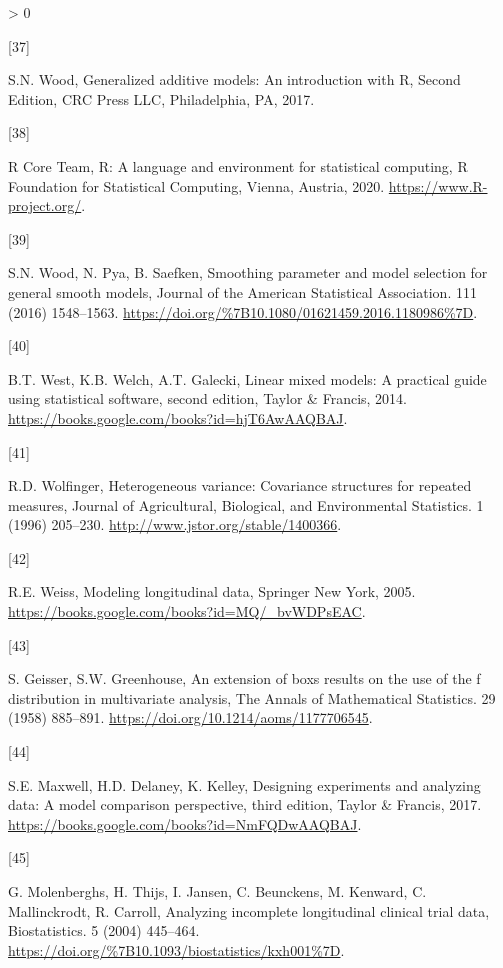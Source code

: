 \documentclass[
]{article}
\newlength{\cslhangindent}
\newlength{\csllabelwidth}
\newenvironment{CSLReferences}[2] %
 {%
  \setlength{\parindent}{0pt}
  \ifodd #1 \everypar{\setlength{\hangindent}{\cslhangindent}}\ignorespaces\fi
  \ifnum #2 > 0
  \setlength{\parskip}{#2\baselineskip}
  \fi
 }%
 {}
\newcommand{\CSLLeftMargin}[1]{\parbox[t]{\csllabelwidth}{#1}}
\newcommand{\CSLRightInline}[1]{\parbox[t]{\linewidth - \csllabelwidth}{#1}\break}
\begin{document}
\begin{CSLReferences}{0}{0}
\leavevmode\hypertarget{ref-wood2017}{}%
\CSLLeftMargin{{[}37{]} }
\CSLRightInline{S.N. Wood, {Generalized additive models: An introduction with R, Second Edition}, CRC Press LLC, Philadelphia, PA, 2017.}

\leavevmode\hypertarget{ref-r}{}%
\CSLLeftMargin{{[}38{]} }
\CSLRightInline{R Core Team, R: A language and environment for statistical computing, R Foundation for Statistical Computing, Vienna, Austria, 2020. \url{https://www.R-project.org/}.}

\leavevmode\hypertarget{ref-wood2016}{}%
\CSLLeftMargin{{[}39{]} }
\CSLRightInline{S.N. Wood, N. Pya, B. Saefken, Smoothing parameter and model selection for general smooth models, {Journal of the American Statistical Association}. {111} (2016) 1548--1563. \url{https://doi.org/\%7B10.1080/01621459.2016.1180986\%7D}.}

\leavevmode\hypertarget{ref-west2014}{}%
\CSLLeftMargin{{[}40{]} }
\CSLRightInline{B.T. West, K.B. Welch, A.T. Galecki, Linear mixed models: A practical guide using statistical software, second edition, Taylor \& Francis, 2014. \url{https://books.google.com/books?id=hjT6AwAAQBAJ}.}

\leavevmode\hypertarget{ref-wolfinger1996}{}%
\CSLLeftMargin{{[}41{]} }
\CSLRightInline{R.D. Wolfinger, Heterogeneous variance: Covariance structures for repeated measures, Journal of Agricultural, Biological, and Environmental Statistics. 1 (1996) 205--230. \url{http://www.jstor.org/stable/1400366}.}

\leavevmode\hypertarget{ref-weiss2005}{}%
\CSLLeftMargin{{[}42{]} }
\CSLRightInline{R.E. Weiss, Modeling longitudinal data, Springer New York, 2005. \url{https://books.google.com/books?id=MQ/_bvWDPsEAC}.}

\leavevmode\hypertarget{ref-geisser1958}{}%
\CSLLeftMargin{{[}43{]} }
\CSLRightInline{S. Geisser, S.W. Greenhouse, An extension of box{{}}s results on the use of the {{}}f{{}} distribution in multivariate analysis, The Annals of Mathematical Statistics. 29 (1958) 885--891. \url{https://doi.org/10.1214/aoms/1177706545}.}

\leavevmode\hypertarget{ref-maxwell2017}{}%
\CSLLeftMargin{{[}44{]} }
\CSLRightInline{S.E. Maxwell, H.D. Delaney, K. Kelley, Designing experiments and analyzing data: A model comparison perspective, third edition, Taylor \& Francis, 2017. \url{https://books.google.com/books?id=NmFQDwAAQBAJ}.}

\leavevmode\hypertarget{ref-molenberghs2004}{}%
\CSLLeftMargin{{[}45{]} }
\CSLRightInline{G. Molenberghs, H. Thijs, I. Jansen, C. Beunckens, M. Kenward, C. Mallinckrodt, R. Carroll, {Analyzing incomplete longitudinal clinical trial data}, {Biostatistics}. {5} (2004) 445--464. \url{https://doi.org/\%7B10.1093/biostatistics/kxh001\%7D}.}


\end{CSLReferences}
\end{document}

